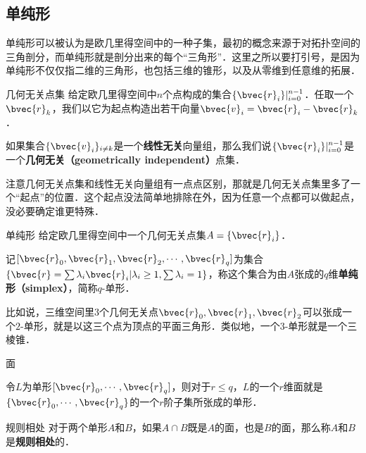 
\subsection{单纯形}

单纯形可以被认为是欧几里得空间中的一种子集，最初的概念来源于对拓扑空间的三角剖分，而单纯形就是剖分出来的每个“三角形”．这里之所以要打引号，是因为单纯形不仅仅指二维的三角形，也包括三维的锥形，以及从零维到任意维的拓展．

\begin{definition}{几何无关点集}
给定欧几里得空间中$n$个点构成的集合$\{\bvec{r}_i\}|_{i=0}^{n-1}$．任取一个$\bvec{r}_k$，我们以它为起点构造出若干向量$\bvec{v}_i=\bvec{r}_i-\bvec{r}_k$．

如果集合$\{\bvec{v}_i\}_{i\not= k}$是一个\textbf{线性无关}向量组，那么我们说$\{\bvec{r}_i\}|_{i=0}^{n-1}$是一个\textbf{几何无关（geometrically independent）}点集．
\end{definition}

注意几何无关点集和线性无关向量组有一点点区别，那就是几何无关点集里多了一个“起点”的位置．这个起点没法简单地排除在外，因为任意一个点都可以做起点，没必要确定谁更特殊．

\begin{definition}{单纯形}
给定欧几里得空间中一个几何无关点集$A=\{\bvec{r}_i\}$．

记$[\bvec{r}_0, \bvec{r}_1, \bvec{r}_2, \cdots, \bvec{r}_q]$为集合$\{\bvec{r}=\sum\lambda_i\bvec{r}_i|\lambda_i\geq 1, \sum\lambda_i=1\}$，称这个集合为由$A$张成的$q$维\textbf{单纯形（simplex）}，简称$q$-单形．

\end{definition}

比如说，三维空间里$3$个几何无关点$\bvec{r}_0, \bvec{r}_1, \bvec{r}_2$可以张成一个$2$-单形，就是以这三个点为顶点的平面三角形．类似地，一个$3$-单形就是一个三棱锥．

\begin{definition}{面}

令$L$为单形$[\bvec{r}_0, \cdots, \bvec{r}_q]$，则对于$r\leq q$，$L$的一个$r$维面就是$\{\bvec{r}_0, \cdots, \bvec{r}_q\}$的一个$r$阶子集所张成的单形．

\end{definition}


\begin{definition}{规则相处}
对于两个单形$A$和$B$，如果$A\cap B$既是$A$的面，也是$B$的面，那么称$A$和$B$是\textbf{规则相处}的．
\end{definition}


